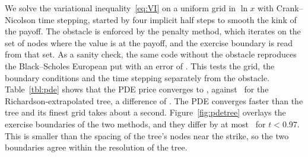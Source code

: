 We solve the variational inequality~\eqref{eq:VI} on a uniform grid in $\ln x$ with Crank--Nicolson time stepping, started by four implicit half steps to smooth the kink of the payoff.
The obstacle is enforced by the penalty method, which iterates on the set of nodes where the value is at the payoff, and the exercise boundary is read from that set.
As a sanity check, the same code without the obstacle reproduces the Black--Scholes European put with an error of \PdeEuErr.
This tests the grid, the boundary conditions and the time stepping separately from the obstacle.
Table~\ref{tbl:pde} shows that the PDE price converges to \PdeV, against \TreeRichV\ for the Richardson-extrapolated tree, a difference of \PdeTreeDiff.
The PDE converges faster than the tree and its finest grid takes about a second.
Figure~\ref{fig:pdetree} overlays the exercise boundaries of the two methods, and they differ by at most \BoundGap\ for $t<0.97$.
This is smaller than the spacing of the tree's nodes near the strike, so the two boundaries agree within the resolution of the tree.
